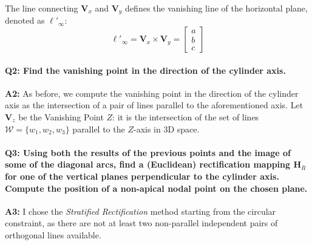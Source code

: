 \documentclass[a4paper,11pt]{article}
\newcommand{\matr}[1]{\bm{#1}}     %
\newcommand{\vect}[1]{\mathbf{#1}}  %
\begin{document}
The line connecting $\vect{V}_x$ and $\vect{V}_y$ defines the vanishing line of the horizontal plane, denoted as $\ell'_\infty$:
\begin{equation}
    \ell'_\infty = \vect{V}_x \times \vect{V}_y = 
    \begin{bmatrix}
    a \\
    b \\
    c
    \end{bmatrix}
\end{equation}

\paragraph{Q2: Find the vanishing point in the direction of the cylinder axis.}

\textbf{A2:} As before, we compute the vanishing point in the direction of the cylinder axis as the intersection of a pair of lines parallel to the aforementioned axis.
Let $\vect{V}_z$ be the Vanishing Point $Z$: it is the intersection of the set of lines $\mathcal{W} = \{w_1, w_2, w_3\}$ parallel to the $Z$-axis in 3D space.

\paragraph{Q3: Using both the results of the previous points and the image of some of the diagonal arcs, find a (Euclidean) rectification mapping $\matr{H}_R$ for one of the vertical planes perpendicular to the cylinder axis. Compute the position of a non-apical nodal point on the chosen plane.}

\textbf{A3:} I chose the \textit{Stratified Rectification} method starting from the circular constraint, as there are not at least two non-parallel independent pairs of orthogonal lines available.
\end{document}
